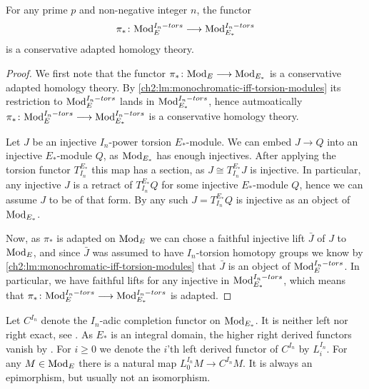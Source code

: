 \begin{lemma}
    \label{ch2:lm:conservative-adapted-torsion-modules}
    For any prime $p$ and non-negative integer $n$, the functor 
    $$\pi_*\colon \mathrm{Mod}_{E}^{I_n-tors}\longrightarrow \mathrm{Mod}_{E_*}^{I_n-tors}$$
    is a conservative adapted homology theory. 
\end{lemma}
\begin{proof}
    We first note that the functor $\pi_*\colon \mathrm{Mod}_{E}\longrightarrow \mathrm{Mod}_{E_*}$ is a conservative adapted homology theory. By \cref{ch2:lm:monochromatic-iff-torsion-modules} its restriction to $\mathrm{Mod}_{E}^{I_n-tors}$ lands in $\mathrm{Mod}_{E_*}^{I_n-tors}$, hence autmoatically $\pi_*\colon \mathrm{Mod}_{E}^{I_n-tors}\longrightarrow \mathrm{Mod}_{E_*}^{I_n-tors}$ is a conservative homology theory. 
    
    Let $J$ be an injective $I_n$-power torsion $E_*$-module. We can embed $J\longrightarrow Q$ into an injective $E_*$-module $Q$, as $\mathrm{Mod}_{E_*}$ has enough injectives. After applying the torsion functor $T^{E_*}_{I_n}$ this map has a section, as $J \cong T^{E_*}_{I_n}J$ is injective. In particular, any injective $J$ is a retract of $T^{E_*}_{I_n}Q$ for some injective $E_*$-module $Q$, hence we can assume $J$ to be of that form. By \cite[2.1.4]{brodmann-sharp_1998} any such $J = T^{E_*}_{I_n}Q$ is injective as an object of $\mathrm{Mod}_{E_*}$. 
    
    Now, as $\pi_*$ is adapted on $\mathrm{Mod}_{E}$ we can chose a faithful injective lift $\bar{J}$ of $J$ to $\mathrm{Mod}_{E}$, and since $\bar{J}$ was assumed to have $I_n$-torsion homotopy groups we know by \cref{ch2:lm:monochromatic-iff-torsion-modules} that $\bar{J}$ is an object of $\mathrm{Mod}_{E}^{I_n-tors}$. In particular, we have faithful lifts for any injective in $\mathrm{Mod}_{E_*}^{I_n-tors}$, which means that $\pi_*\colon \mathrm{Mod}_{E}^{I_n-tors}\longrightarrow \mathrm{Mod}_{E_*}^{I_n-tors}$ is adapted. 
\end{proof}

Let $C^{I_n}$ denote the $I_n$-adic completion functor on $\mathrm{Mod}_{E_*}$. It is neither left nor right exact, see \cite[Appendix A.]{hovey-strickland_99}. As $E_*$ is an integral domain, the higher right derived functors vanish by \cite[5.1]{greenlees-may_92}. For $i\geq 0$ we denote the $i$'th left derived functor of $C^{I_n}$ by $L^{I_n}_i$. For any $M\in \mathrm{Mod}_{E}$ there is a natural map $L^{I_n}_0 M \longrightarrow C^{I_n}M$. It is always an epimorphism, but usually not an isomorphism. 

